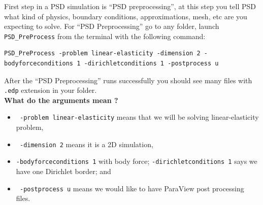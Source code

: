 First step in a PSD simulation is ``PSD preprocessing'', at this step you tell PSD what kind of physics, boundary conditions, approximations, mesh, etc are you expecting to solve.
For ``PSD Preprocessing'' go to any folder, launch \lstinline[style=Linux]!PSD_PreProcess! from the terminal with the following command:
\begin{lstlisting}[style=BashInputStyle]  
PSD_PreProcess -problem linear-elasticity -dimension 2 -bodyforceconditions 1 -dirichletconditions 1 -postprocess u
\end{lstlisting}
%
After the ``PSD Preprocessing'' runs successfully you should see many files with \lstinline[style=Linux]!.edp! extension in your folder.\\
\noindent\textbf{What do the arguments mean ?}
\begin{itemize}
	\item \lstinline[style=Linux]! -problem linear-elasticity! means that we will be solving linear-elasticity problem,
	\item \lstinline[style=Linux]! -dimension 2! means it is a 2D simulation, 
	\item \lstinline[style=Linux]!-bodyforceconditions 1! with body force; \lstinline[style=Linux]!-dirichletconditions 1! says we have one Dirichlet border; and 
	\item \lstinline[style=Linux]! -postprocess u! means we would like to have ParaView post processing files.
\end{itemize}    

